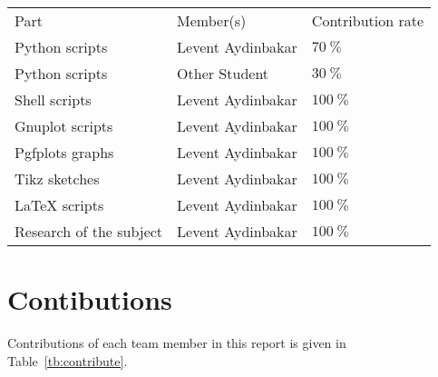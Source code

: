 \begin{table*}[ht!]
\caption{Contribution of each team member}
\label{tb:contribute}
\begin{tabular}{l l l }
Part & Member(s) & Contribution rate \\
Python scripts & Levent Aydinbakar & $70~\%$ \\
Python scripts & Other Student & $30~\%$ \\
Shell scripts & Levent Aydinbakar & $100~\%$ \\
Gnuplot scripts & Levent Aydinbakar & $100~\%$ \\
Pgfplots graphs & Levent Aydinbakar & $100~\%$ \\
Tikz sketches & Levent Aydinbakar & $100~\%$ \\
\LaTeX{} scripts & Levent Aydinbakar & $100~\%$ \\
Research of the subject & Levent Aydinbakar & $100~\%$ \\
\end{tabular}
\end{table*}

\section{Contibutions}
\label{sec:contributions}

Contributions of each team member in this report is given in Table~\ref{tb:contribute}.

